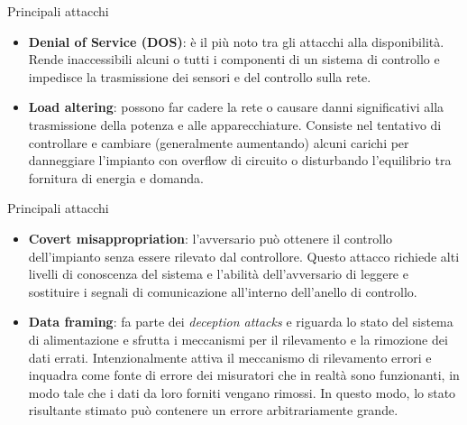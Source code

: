 \documentclass{beamer}
\begin{document}
\begin{frame}{Principali attacchi}
    \begin{itemize}
        \item \textbf{Denial of Service (DOS)}: è il più noto tra gli attacchi alla disponibilità. Rende inaccessibili alcuni o tutti i componenti di un 
        sistema di controllo e impedisce la trasmissione dei sensori e del controllo sulla rete.
        \item \textbf{Load altering}: possono far cadere la rete o causare danni significativi alla trasmissione della potenza e alle apparecchiature.
        Consiste nel tentativo di controllare e cambiare (generalmente aumentando) alcuni carichi per danneggiare l'impianto con overflow di circuito
        o disturbando l'equilibrio tra fornitura di energia e domanda.
    \end{itemize}
\end{frame}

\begin{frame}{Principali attacchi}
    \begin{itemize}
        \item \textbf{Covert misappropriation}: l'avversario può ottenere il controllo dell'impianto senza essere rilevato dal controllore. 
        Questo attacco richiede alti livelli di conoscenza del sistema e l'abilità dell'avversario di leggere e sostituire i segnali di comunicazione  
        all'interno dell'anello di controllo.
        \item \textbf{Data framing}: fa parte dei \textit{deception attacks} e riguarda lo stato del sistema di alimentazione e sfrutta i meccanismi 
        per il rilevamento e la rimozione dei dati errati. Intenzionalmente attiva il meccanismo di rilevamento errori e inquadra come fonte di errore dei
        misuratori che in realtà sono funzionanti, in modo tale che i dati da loro forniti vengano rimossi. In questo modo, lo stato risultante stimato
        può contenere un errore arbitrariamente grande. 
    \end{itemize}
\end{frame}
\end{document}
